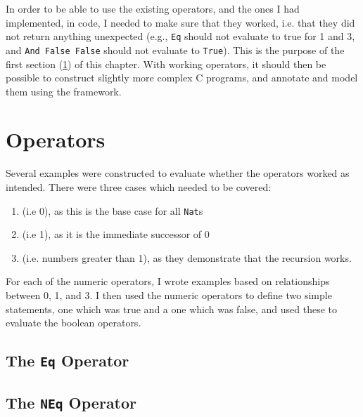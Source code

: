 In order to be able to use the existing operators, and the ones I had implemented, in code, I needed to make sure that they worked, i.e. that they did not return anything unexpected (e.g., \texttt{Eq} should not evaluate to true for 1 and 3, and \texttt{And False False} should not evaluate to \texttt{True}). This is the purpose of the first section (\ref{evaln:ops}) of this chapter. With working operators, it should then be possible to construct slightly more complex C programs, and annotate and model them using the framework.


\section{Operators}\label{evaln:ops}
	Several examples were constructed to evaluate whether the operators worked
	as intended. There were three cases which needed to be covered:
	\begin{enumerate}
		\item {} (i.e 0), as this is the base case for all
			  \texttt{Nat}s
		\item {} (i.e 1), as it is the immediate successor of 0
		\item {} (i.e. numbers greater than 1), as they
			  demonstrate that the recursion works.
	\end{enumerate}
	For each of the numeric operators, I wrote examples based on relationships between 0, 1, and 3. I then used the numeric operators to define two simple statements, one which was true and a one which was false, and used these to evaluate the boolean operators.
	
	\newpage
	
    \subsection{The \texttt{Eq} Operator}
    
    \subsection{The \texttt{NEq} Operator}\label{evaln:ops:neq}
    
